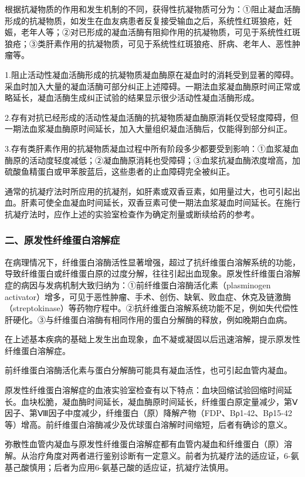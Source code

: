 根据抗凝物质的作用和发生机制的不同，获得性抗凝物质可分为：①阻止凝血活酶形成的抗凝物质，如发生在血友病患者反复接受输血之后，系统性红斑狼疮，妊娠，老年人等；②对已形成的凝血活酶有阻抑作用的抗凝物质，可见于系统性红斑狼疮；③类肝素作用的抗凝物质，可见于系统性红斑狼疮、肝病、老年人、恶性肿瘤等。

1.阻止活动性凝血活酶形成的抗凝物质凝血酶原在凝血时的消耗受到显著的障碍。采血时加入大量的凝血活酶可部分纠正上述障碍。一期法血浆凝血酶原时间正常或略延长，凝血活酶生成纠正试验的结果显示很少活动性凝血活酶形成。

2.存有对抗已经形成的活动性凝血活酶的抗凝物质凝血酶原消耗仅受轻度障碍，但一期法血浆凝血酶原时间延长，加入大量组织凝血活酶后，仅能得到部分纠正。

3.存有类肝素作用的抗凝物质凝血过程中所有阶段多少都要受到影响：①血浆凝血酶原的活动度轻度减低；②凝血酶原消耗也受障碍；③血浆抗凝血酶浓度增高，加硫酸鱼精蛋白或甲苯胺蓝后，这些患者的止血障碍完全被纠正。

通常的抗凝疗法时所应用的抗凝剂，如肝素或双香豆素，如用量过大，也可引起出血。肝素可使全血凝血时间延长，双香豆素可使一期法血浆凝血时间延长。在施行抗凝疗法时，应作上述的实验室检查作为确定剂量或断续给药的参考。

\subsubsection{二、原发性纤维蛋白溶解症}

在病理情况下，纤维蛋白溶酶活性显著增强，超过了抗纤维蛋白溶解系统的功能，导致纤维蛋白或纤维蛋白原的过度分解，往往引起出血现象。原发性纤维蛋白溶解症的病因与发病机制大致归纳为：①前纤维蛋白溶酶活化素（plasminogen
activator）增多，可见于恶性肿瘤、手术、创伤、缺氧、败血症、休克及链激酶（streptokinase）等药物疗程中。②抗纤维蛋白溶解系统功能不足，例如失代偿性肝硬化。③与纤维蛋白溶酶有相同作用的蛋白分解酶的释放，例如晚期白血病。

在上述基本疾病的基础上发生出血现象，血不凝或凝固以后迅速溶解，提示原发性纤维蛋白溶解症。

前纤维蛋白溶酶活化素与蛋白分解酶可能具有凝血活性，也可引起血管内凝血。

原发性纤维蛋白溶解症的血液实验室检查有以下特点：血块回缩试验回缩时间延长。血块松脆，凝血酶时间延长，凝血酶原时间延长，纤维蛋白原定量减少，第Ⅴ因子、第Ⅷ因子中度减少，纤维蛋白（原）降解产物（FDP、Bρ1-42、Bρ15-42等）增高。前纤维蛋白溶酶减少及优球蛋白溶解时间缩短，后者有确诊的意义。

弥散性血管内凝血与原发性纤维蛋白溶解症都有血管内凝血和纤维蛋白（原）溶解。从治疗角度对两者进行鉴别诊断有一定意义。前者为抗凝疗法的适应证，6-氨基己酸慎用；后者为应用6-氨基己酸的适应证，抗凝疗法慎用。

